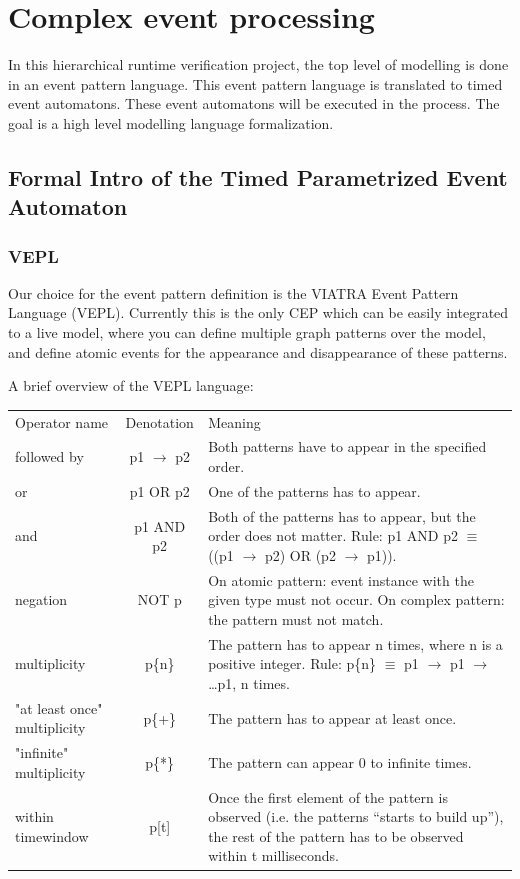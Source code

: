\chapter{Complex event processing}
	\label{chap:cep}
		In this hierarchical runtime verification project, the top level of modelling is done in an event pattern language.
		This event pattern language is translated to timed event automatons. These event automatons will be executed in the
		process. The goal is a high level modelling language formalization. 
	\section{Formal Intro of the Timed Parametrized Event Automaton}
		\subsection{VEPL}
			Our choice for the event pattern definition is the VIATRA Event Pattern Language (VEPL).
			Currently this is the only CEP which can be easily integrated to a live model, where 
			you can define multiple graph patterns over the model, and define atomic events for the
			appearance and disappearance of these patterns.
			
			A brief overview of the VEPL language:

		\begin{tabular}{lcm{6cm}}
		\centering
		Operator name &	Denotation & Meaning \\
		followed by & p1 $\rightarrow$ p2 & Both patterns have to appear in the specified order. \\
		or &	p1 OR p2 &	One of the patterns has to appear. \\
		and &	p1 AND p2 &	Both of the patterns has to appear, but the order does not matter. Rule: p1 AND p2 $\equiv$ ((p1 $\rightarrow$ p2) OR (p2 $\rightarrow$ p1)). \\
		negation &	NOT p &	On atomic pattern: event instance with the given type must not occur. On complex pattern: the pattern must not match. \\
		multiplicity &	p\{n\} &	The pattern has to appear n times, where n is a positive integer. Rule: p\{n\} $\equiv$ p1 $\rightarrow$ p1 $\rightarrow$ \dots p1, n times. \\
		"at least once" multiplicity &	p\{+\} &	The pattern has to appear at least once. \\
		"infinite" multiplicity &	p\{*\} &	The pattern can appear 0 to infinite times. \\
		within timewindow &	p[t] &	Once the first element of the pattern is observed (i.e. the patterns ``starts to build up''), the rest of the pattern has to be observed within t milliseconds.
		\end{tabular}	
			
